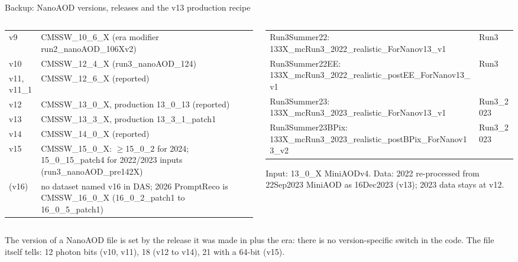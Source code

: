 \begin{frame}{Backup: NanoAOD versions, releases and the v13 production recipe}
  \begin{columns}[T]
    \begin{column}{0.48\linewidth}
      {\tiny
      \begin{tabularx}{\linewidth}{@{}lY@{}}
        \toprule
         & \\\midrule
        v9 & CMSSW\_10\_6\_X (era modifier run2\_nanoAOD\_106Xv2)\\
        v10 & CMSSW\_12\_4\_X (run3\_nanoAOD\_124)\\
        v11, v11\_1 & CMSSW\_12\_6\_X (reported)\\
        v12 & CMSSW\_13\_0\_X, production 13\_0\_13 (reported)\\
        v13 & CMSSW\_13\_3\_X, production 13\_3\_1\_patch1\\
        v14 & CMSSW\_14\_0\_X (reported)\\
        v15 & CMSSW\_15\_0\_X: $\geq$15\_0\_2 for 2024; 15\_0\_15\_patch4 for 2022/2023 inputs (run3\_nanoAOD\_pre142X)\\
        (v16) & no dataset named v16 in DAS; 2026 PromptReco is CMSSW\_16\_0\_X (16\_0\_2\_patch1 to 16\_0\_5\_patch1)\\\bottomrule
      \end{tabularx}}
    \end{column}
    \begin{column}{0.50\linewidth}
      {\tiny
      \begin{tabularx}{\linewidth}{@{}Yl@{}}
        \toprule
         & \\\midrule
        Run3Summer22: 133X\_mcRun3\_2022\_realistic\_ForNanov13\_v1 & Run3\\
        Run3Summer22EE: 133X\_mcRun3\_2022\_realistic\_postEE\_ForNanov13\_v1 & Run3\\
        Run3Summer23: 133X\_mcRun3\_2023\_realistic\_ForNanov13\_v1 & Run3\_2023\\
        Run3Summer23BPix: 133X\_mcRun3\_2023\_realistic\_postBPix\_ForNanov13\_v2 & Run3\_2023\\\bottomrule
      \end{tabularx}}
      \par\vspace{4pt}
      {\tiny Input: 13\_0\_X MiniAODv4. Data: 2022 re-processed from 22Sep2023 MiniAOD as 16Dec2023 (v13); 2023 data
      stays at v12.}
    \end{column}
  \end{columns}
  \par\vspace{6pt}
  {\scriptsize The version of a NanoAOD file is set by the release it was made in plus the era: there is no
  version-specific switch in the code. The file itself tells: 12 photon bits (v10, v11), 18 (v12 to v14),
  21 with a 64-bit  (v15).}
\end{frame}

